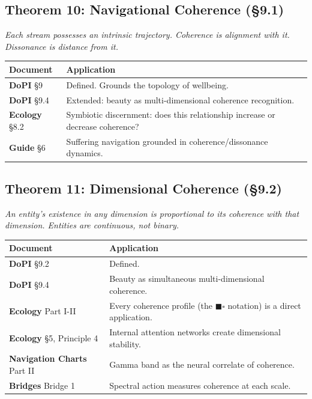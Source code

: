 \subsection*{Theorem 10: Navigational Coherence (§9.1)}


\textit{Each stream possesses an intrinsic trajectory. Coherence is alignment with it. Dissonance is distance from it.}



\begin{longtable}{p{} p{}}
\toprule
\textbf{Document} & \textbf{Application} \\
\midrule
\endhead
\textbf{DoPI} §9 & Defined. Grounds the topology of wellbeing. \\
\textbf{DoPI} §9.4 & Extended: beauty as multi-dimensional coherence recognition. \\
\textbf{Ecology} §8.2 & Symbiotic discernment: does this relationship increase or decrease coherence? \\
\textbf{Guide} §6 & Suffering navigation grounded in coherence/dissonance dynamics. \\
\bottomrule
\end{longtable}



\subsection*{Theorem 11: Dimensional Coherence (§9.2)}


\textit{An entity's existence in any dimension is proportional to its coherence with that dimension. Entities are continuous, not binary.}



\begin{longtable}{p{} p{}}
\toprule
\textbf{Document} & \textbf{Application} \\
\midrule
\endhead
\textbf{DoPI} §9.2 & Defined. \\
\textbf{DoPI} §9.4 & Beauty as simultaneous multi-dimensional coherence. \\
\textbf{Ecology} Part I-II & Every coherence profile (the $\blacksquare$$\square$ notation) is a direct application. \\
\textbf{Ecology} §5, Principle 4 & Internal attention networks create dimensional stability. \\
\textbf{Navigation Charts} Part II & Gamma band as the neural correlate of coherence. \\
\textbf{Bridges} Bridge 1 & Spectral action measures coherence at each scale. \\
\bottomrule
\end{longtable}



